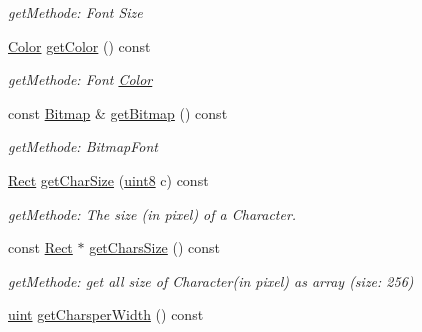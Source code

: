 \begin{DoxyCompactItemize}
\begin{DoxyCompactList}\small\item\em getMethode: Font Size \item\end{DoxyCompactList}\item 
\hypertarget{class_f2_c_1_1_t_t_f_font_a618029b50e7385611dbe5fba673cd985}{
\hyperlink{class_f2_c_1_1_color}{Color} \hyperlink{class_f2_c_1_1_t_t_f_font_a618029b50e7385611dbe5fba673cd985}{getColor} () const }
\label{class_f2_c_1_1_t_t_f_font_a618029b50e7385611dbe5fba673cd985}

\begin{DoxyCompactList}\small\item\em getMethode: Font \hyperlink{class_f2_c_1_1_color}{Color} \item\end{DoxyCompactList}\item 
\hypertarget{class_f2_c_1_1_t_t_f_font_a70e5eb65c951158ef1515afaed455b16}{
const \hyperlink{class_f2_c_1_1_bitmap}{Bitmap} \& \hyperlink{class_f2_c_1_1_t_t_f_font_a70e5eb65c951158ef1515afaed455b16}{getBitmap} () const }
\label{class_f2_c_1_1_t_t_f_font_a70e5eb65c951158ef1515afaed455b16}

\begin{DoxyCompactList}\small\item\em getMethode: BitmapFont \item\end{DoxyCompactList}\item 
\hyperlink{class_f2_c_1_1_rect}{Rect} \hyperlink{class_f2_c_1_1_t_t_f_font_ae9122df089408bb62dc4cdc99241afc1}{getCharSize} (\hyperlink{namespace_f2_c_a711deb33697d145669b9c0c4fe87c7ca}{uint8} c) const 
\begin{DoxyCompactList}\small\item\em getMethode: The size (in pixel) of a Character. \item\end{DoxyCompactList}\item 
\hypertarget{class_f2_c_1_1_t_t_f_font_a976512bee62153a748eb02fd608e249c}{
const \hyperlink{class_f2_c_1_1_rect}{Rect} $\ast$ \hyperlink{class_f2_c_1_1_t_t_f_font_a976512bee62153a748eb02fd608e249c}{getCharsSize} () const }
\label{class_f2_c_1_1_t_t_f_font_a976512bee62153a748eb02fd608e249c}

\begin{DoxyCompactList}\small\item\em getMethode: get all size of Character(in pixel) as array (size: 256) \item\end{DoxyCompactList}\item 
\hypertarget{class_f2_c_1_1_t_t_f_font_a4c001ec0c1f86625845cfefc4e94ea13}{
\hyperlink{namespace_f2_c_a58be2bac9eb3e3c99cb41b6008bf4fae}{uint} \hyperlink{class_f2_c_1_1_t_t_f_font_a4c001ec0c1f86625845cfefc4e94ea13}{getCharsperWidth} () const }
\label{class_f2_c_1_1_t_t_f_font_a4c001ec0c1f86625845cfefc4e94ea13}


\end{DoxyCompactItemize}
